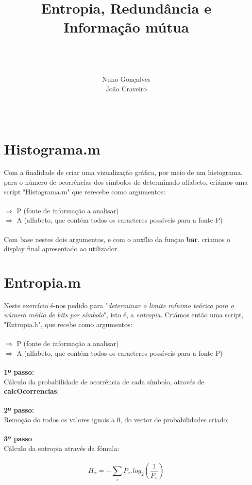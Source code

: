 \documentclass{article}
\begin{document}
\title{\bfseries{}Entropia, Redundância e \\Informação mútua}

\author{\\ \\ \\Nuno Gonçalves \\ João Craveiro \\ \\ \\ }

\maketitle

\newpage

\section{Histograma.m}
Com a finalidade de criar uma vizualização gráfica, por meio de um histograma, para o número de ocorrências dos símbolos de determinado alfabeto, criámos uma script "Histograma.m" que rerecebe como argumentos:\\\\
$\Rightarrow$ P (fonte de informação a analisar)\\
$\Rightarrow$ A (alfabeto, que contém todos os caracteres possíveis para a fonte P)\\\\
Com base nestes dois argumentos, e com o auxílio da funçao \textbf{bar}, criamos o display final apresentado ao utilizador.

\section{Entropia.m}

Neste exercício é-nos pedido para "\textit{determinar o limite mínimo teórico para o número médio de bits por símbolo}", isto é, a \textit{entropia}. Criámos então uma script, "Entropia.h", que recebe como argumentos:\\\\
$\Rightarrow$ P (fonte de informação a analisar)\\
$\Rightarrow$ A (alfabeto, que contém todos os caracteres possíveis para a fonte P)\\\\
\textbf{1º passo:}\\
Cálculo da probabilidade de ocorrência de cada símbolo, através de \textbf{calcOcorrencias};\\\\
\textbf{2º passo:}\\
Remoção do todos os valores iguais a 0, do vector de probabilidades criado;\\\\
\textbf{3º passo}\\
Cálculo da entropia através da fómula:\\\\
\[
H_x = -\sum_i P_x . log_2 \left(\frac{1}{P_x}\right)
\]
\end{document}
